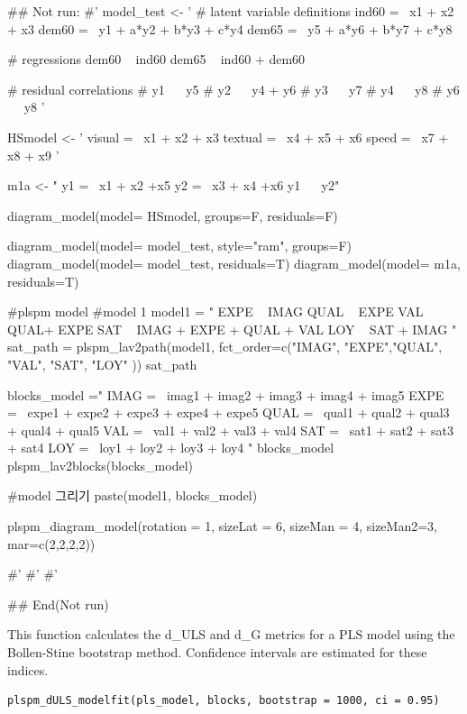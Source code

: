 \documentclass[a4paper]{book}
\begin{document}
\begin{Examples}
\begin{ExampleCode}
## Not run: 
#'
model_test <- '
  # latent variable definitions
     ind60 =~ x1 + x2 + x3
     dem60 =~ y1 + a*y2 + b*y3 + c*y4
     dem65 =~ y5 + a*y6 + b*y7 + c*y8

  # regressions
    dem60 ~ ind60
    dem65 ~ ind60 + dem60

  # residual correlations
    # y1 ~~ y5
    # y2 ~~ y4 + y6
    # y3 ~~ y7
    # y4 ~~ y8
    # y6 ~~ y8
'

HSmodel <- ' visual  =~ x1 + x2 + x3
             textual =~ x4 + x5 + x6
             speed   =~ x7 + x8 + x9 '


m1a <- "
y1 =~ x1 + x2 +x5
y2 =~ x3 + x4 +x6
y1 ~~ y2"

diagram_model(model= HSmodel, groups=F,  residuals=F)

diagram_model(model= model_test, style="ram", groups=F)
diagram_model(model= model_test, residuals=T)
diagram_model(model= m1a, residuals=T)


#plspm model
#model 1
model1 = "
EXPE ~ IMAG
QUAL ~ EXPE
VAL ~  QUAL+ EXPE
SAT ~ IMAG + EXPE + QUAL + VAL
LOY ~ SAT + IMAG
"
sat_path = plspm_lav2path(model1,
                          fct_order=c("IMAG", "EXPE","QUAL", "VAL", "SAT", "LOY" ))
sat_path

blocks_model ="
IMAG =~ imag1 + imag2 + imag3 + imag4 + imag5
EXPE =~ expe1 + expe2 + expe3 + expe4 + expe5
QUAL =~ qual1 + qual2 + qual3 + qual4 + qual5
VAL =~ val1 + val2 + val3 + val4
SAT =~ sat1 + sat2 + sat3 + sat4
LOY =~ loy1 + loy2 + loy3 + loy4
"
blocks_model
plspm_lav2blocks(blocks_model)

#model 그리기
paste(model1, blocks_model)%

  plspm_diagram_model(rotation = 1, sizeLat = 6, sizeMan = 4, sizeMan2=3,
                mar=c(2,2,2,2))

#'
#'
#'

## End(Not run)
\end{ExampleCode}
\end{Examples}
%
\begin{Description}
This function calculates the d\_ULS and d\_G metrics for a PLS model using the Bollen-Stine bootstrap method.
Confidence intervals are estimated for these indices.
\end{Description}
%
\begin{Usage}
\begin{verbatim}
plspm_dULS_modelfit(pls_model, blocks, bootstrap = 1000, ci = 0.95)
\end{verbatim}
\end{Usage}
\end{document}
